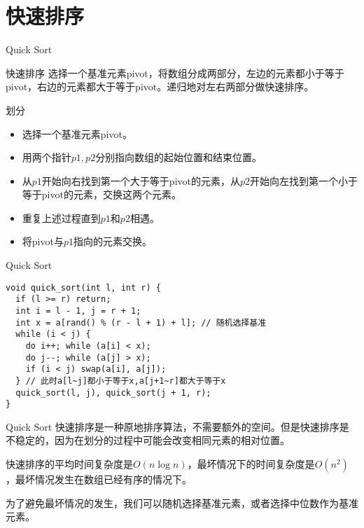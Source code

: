 \documentclass{ldr-simple-gray}
\begin{document}
  \section{快速排序}
  \begin{frame}{Quick Sort}
    \begin{block}{快速排序}
      选择一个基准元素pivot，将数组分成两部分，左边的元素都小于等于pivot，右边的元素都大于等于pivot。递归地对左右两部分做快速排序。
    \end{block}
    \begin{block}{划分}
      \begin{itemize}
        \item 选择一个基准元素pivot。
        \item 用两个指针$p1,p2$分别指向数组的起始位置和结束位置。
        \item 从$p1$开始向右找到第一个大于等于pivot的元素，从$p2$开始向左找到第一个小于等于pivot的元素，交换这两个元素。
        \item 重复上述过程直到$p1$和$p2$相遇。
        \item 将pivot与$p1$指向的元素交换。
      \end{itemize}
    \end{block}
  \end{frame}

  \begin{frame}[fragile]{Quick Sort}
    \begin{verbatim}
void quick_sort(int l, int r) {
  if (l >= r) return;
  int i = l - 1, j = r + 1;
  int x = a[rand() % (r - l + 1) + l]; // 随机选择基准
  while (i < j) {
    do i++; while (a[i] < x);
    do j--; while (a[j] > x);
    if (i < j) swap(a[i], a[j]);
  } // 此时a[l~j]都小于等于x,a[j+1~r]都大于等于x
  quick_sort(l, j), quick_sort(j + 1, r);
}\end{verbatim}
  \end{frame}

  \begin{frame}{Quick Sort}
    快速排序是一种原地排序算法，不需要额外的空间。但是快速排序是不稳定的，因为在划分的过程中可能会改变相同元素的相对位置。\newline

    快速排序的平均时间复杂度是$O(n\log n)$，最坏情况下的时间复杂度是$O(n^2)$，最坏情况发生在数组已经有序的情况下。\newline

    为了避免最坏情况的发生，我们可以随机选择基准元素，或者选择中位数作为基准元素。
  \end{frame}
\end{document}
